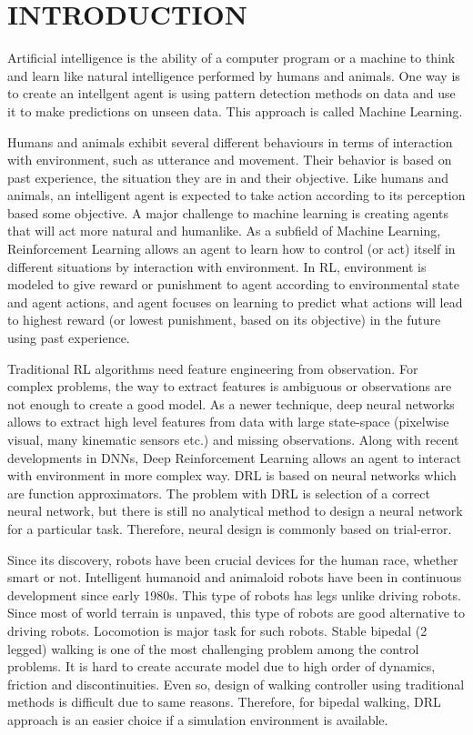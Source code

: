 \chapter{INTRODUCTION}
\label{chap:intro}

Artificial intelligence is the ability of a computer program 
or a machine to think and learn like natural intelligence 
performed by humans and animals. 
One way is to create an intellgent agent is using pattern detection  methods on data and use it to make predictions on unseen data. 
This approach is called Machine Learning. 

Humans and animals exhibit several different behaviours in terms of 
interaction with environment, such as utterance and movement. 
Their behavior is based on past experience, the situation they are in  and their objective. 
Like humans and animals, an intelligent agent is expected to take 
action according to its perception based some objective. 
A major challenge to machine learning is creating agents that will 
act more natural and humanlike. 
As a subfield of Machine Learning, Reinforcement Learning allows an 
agent to learn how to control (or act) itself in different situations by interaction with environment. 
In RL, environment is modeled to give reward or punishment to agent 
according to environmental state and agent actions, and agent focuses
on learning to predict what actions will lead to highest reward 
(or lowest punishment, based on its objective) in the future using past experience. 

Traditional RL algorithms need feature engineering from observation. 
For complex problems, the way to extract features is ambiguous or 
observations are not enough to create a good model. 
As a newer  technique, deep neural networks allows to extract 
high level features from data with large state-space 
(pixelwise visual, many kinematic sensors etc.) and missing  observations. 
Along with recent developments in DNNs, Deep Reinforcement Learning 
allows an agent to interact with environment in more complex way. 
DRL is based on neural networks which are function approximators. 
The problem with DRL is selection of a correct neural network, 
but there is still no analytical method to design a neural network for a particular task. 
Therefore, neural design is commonly based on trial-error. 

Since its discovery, robots have been crucial devices for the human race, whether smart or not. 
Intelligent humanoid and animaloid robots have been in 
continuous development since early 1980s. 
This type of robots has legs unlike driving robots. 
Since most of world terrain is unpaved, this type of robots are good alternative to driving robots. 
Locomotion is major task for such robots. Stable bipedal (2 legged)  walking 
is one of the most challenging problem among the control problems. 
It is hard to create accurate model due to high order of dynamics,  friction and discontinuities. 
Even so, design of walking controller using traditional methods is difficult due to same reasons. 
Therefore, for bipedal walking, DRL approach is an easier choice if a simulation environment is available. 

